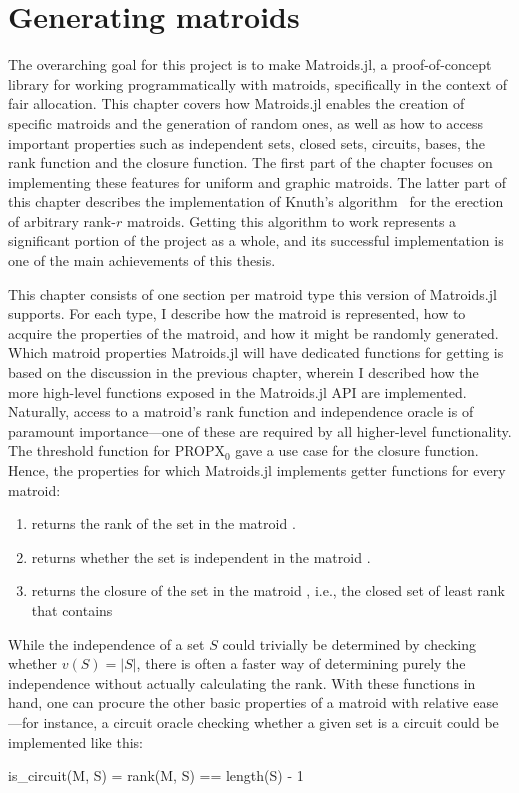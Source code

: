 \chapter{Generating matroids}
\label{chap:generating_matroids}
The overarching goal for this project is to make Matroids.jl, a proof-of-concept library for working programmatically with matroids, specifically in the context of fair allocation. This chapter covers how Matroids.jl enables the creation of specific matroids and the generation of random ones, as well as how to access important properties such as independent sets, closed sets, circuits, bases, the rank function and the closure function. The first part of the chapter focuses on implementing these features for uniform and graphic matroids. The latter part of this chapter describes the implementation of Knuth's algorithm~\cite{knuth-1975} for the erection of arbitrary rank-$r$ matroids. Getting this algorithm to work represents a significant portion of the project as a whole, and its successful implementation is one of the main achievements of this thesis.

This chapter consists of one section per matroid type this version of Matroids.jl supports. For each type, I describe how the matroid is represented, how to acquire the properties of the matroid, and how it might be randomly generated. Which matroid properties Matroids.jl will have dedicated functions for getting is based on the discussion in the previous chapter, wherein I described how the more high-level functions exposed in the Matroids.jl API are implemented. Naturally, access to a matroid's rank function and independence oracle is of paramount importance---one of these are required by all higher-level functionality. The threshold function for PROPX$_0$ gave a use case for the closure function. Hence, the properties for which Matroids.jl implements getter functions for every matroid: 
\begin{enumerate}
  \item {} returns the rank of the set  in the matroid .
  \item {} returns whether the set  is independent in the matroid .
  \item {} returns the closure of the set  in the matroid , i.e., the closed set of least rank that contains 
\end{enumerate}
While the independence of a set $S$ could trivially be determined by checking whether $v(S) = |S|$, there is often a faster way of determining purely the independence without actually calculating the rank. With these functions in hand, one can procure the other basic properties of a matroid with relative ease---for instance, a circuit oracle checking whether a given set is a circuit could be implemented like this:
\begin{jllisting}
is_circuit(M, S) = rank(M, S) == length(S) - 1
\end{jllisting}


